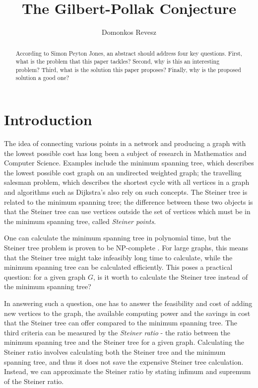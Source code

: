 \documentclass{mpaper}
\begin{document}
\newtheorem{lemma}{Lemma}
\newtheorem{theorem}{Theorem}
\newtheorem{conjecture}{Conjecture}
\theoremstyle{definition}
\newtheorem{definition}{Definition}
\newtheorem*{remark}{Remark}

\title{The Gilbert-Pollak Conjecture}
\author{Domonkos Revesz}

\maketitle

\begin{abstract}
According to Simon Peyton Jones, an abstract should address
four key questions. First, what is the problem that this
paper tackles? Second, why is this an interesting problem?
Third, what is the solution this paper proposes?
Finally, why is the proposed solution a good one?
\end{abstract}

\section{Introduction}

The idea of connecting various points in a network and producing a graph with the lowest possible cost has long been a subject of research in Mathematics and Computer Science. Examples include the minimum spanning tree, which describes the lowest possible cost graph on an undirected weighted graph; the travelling salesman problem, which describes the shortest cycle with all vertices in a graph and algorithms such as Dijkstra's also rely on such concepts. The Steiner tree is related to the minimum spanning tree; the difference between these two objects is that the Steiner tree can use vertices outside the set of vertices which must be in the minimum spanning tree, called \emph{Steiner points}.

One can calculate the minimum spanning tree in polynomial time, but the Steiner tree problem is proven to be NP-complete \cite{Pettie2008}. For large graphs, this means that the Steiner tree might take infeasibly long time to calculate, while the minimum spanning tree can be calculated efficiently. This poses a practical question: for a given graph $G$, is it worth to calculate the Steiner tree instead of the minimum spanning tree?

 In answering such a question, one has to answer the feasibility and cost of adding new vertices to the graph, the available computing power and the savings in cost that the Steiner tree can offer compared to the minimum spanning tree. The third criteria can be measured by the \emph{Steiner ratio} - the ratio between the minimum spanning tree and the Steiner tree for a given graph. Calculating the Steiner ratio involves calculating both the Steiner tree and the minimum spanning tree, and thus it does not save the expensive Steiner tree calculation. Instead, we can approximate the Steiner ratio by stating infimum and supremum of the Steiner ratio.
 
\end{document}
